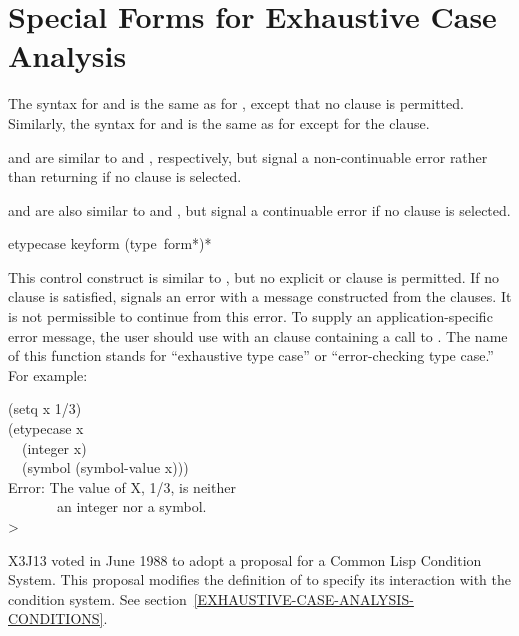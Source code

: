 \section{Special Forms for Exhaustive Case Analysis}
\label{EXHAUSTIVE-CASE-ANALYSIS}

The syntax for  and  is the same as for
, except that no  clause is permitted.
Similarly, the syntax for  and  is the same as for
 except for the  clause.

 and  are similar to  and ,
respectively, but signal a non-continuable error rather than returning
{\false} if no clause is selected.

 and  are also similar to  and ,
but signal a continuable error if no clause is selected.

\begin{defmac}
etypecase keyform {(type {\,form}*)}*

\begin{obsolete}\noindent
This control construct is similar to ,
but no explicit  or  clause is permitted.
If no clause is satisfied,  signals an error with
a message constructed from the clauses.  It is not permissible to
continue from this error.  To supply an application-specific error message, the
user should use  with an  clause containing a call
to .  The name of this function stands for ``exhaustive
type case'' or ``error-checking type case.''
For example:
\begin{lisp}
(setq x 1/3) \\
(etypecase x \\
~~(integer x) \\
~~(symbol (symbol-value x))) \\
Error: The value of X, 1/3, is neither \\
~~~~~~~an integer nor a symbol. \\
>
\end{lisp}
\end{obsolete}

\begin{new}
X3J13 voted in June 1988
to adopt a proposal for a Common Lisp Condition System. 
This proposal modifies the definition of  to specify its
interaction with the condition system.
See section~\ref{EXHAUSTIVE-CASE-ANALYSIS-CONDITIONS}.
\end{new}
\end{defmac}


